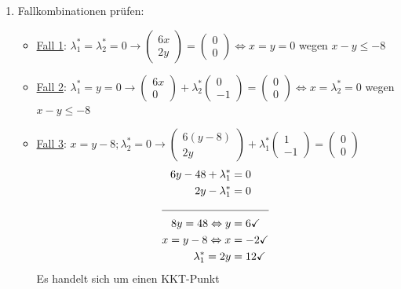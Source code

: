 \begin{enumerate}
    \item Fallkombinationen prüfen:
        \begin{itemize}
            \item \underline{Fall 1}: \(\lambda_1^* = \lambda_2^* = 0 \rightarrow \begin{pmatrix}
                6x\\2y
                \end{pmatrix} = \begin{pmatrix}
                    0\\0
                \end{pmatrix}\Leftrightarrow x=y=0\) \Lightning \hspace{0.1em} wegen \(x-y\leq-8\)
            \item \underline{Fall 2}: \(\lambda_1^* = y = 0 \rightarrow \begin{pmatrix}
                6x\\0
                \end{pmatrix} + \lambda_2^* \begin{pmatrix}
                    0\\-1
                \end{pmatrix}
                 = \begin{pmatrix}
                    0\\0
                \end{pmatrix}\Leftrightarrow x=\lambda_2^*=0\) \Lightning \hspace{0.1em} wegen \(x-y\leq-8\)

            \item \underline{Fall 3}: \(x=y-8; \lambda_2^*=0 \rightarrow
                \begin{pmatrix}
                    6(y-8)\\2y
                \end{pmatrix} + \lambda_1^* \begin{pmatrix}
                    1\\-1
                \end{pmatrix} = \begin{pmatrix}
                    0\\0
                \end{pmatrix}\)\\
                \begin{align*}
                    6y-48+\lambda_1^* &= 0\\
                    2y-\lambda_1^* &= 0\\
                    \cline{1-2}
                    8y = 48 \Leftrightarrow y &= 6 \checkmark\\
                    x = y-8 \Leftrightarrow x &= -2 \checkmark\\
                    \lambda_1^* = 2y &= 12 \checkmark\\
                \end{align*} Es handelt sich um einen KKT-Punkt


\end{itemize}
\end{enumerate}

